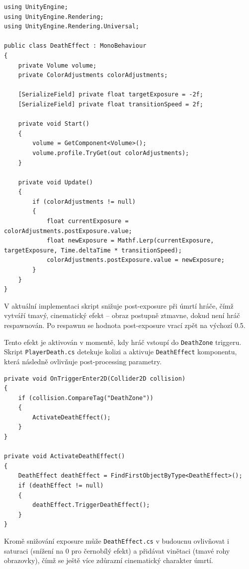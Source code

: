 \newpage

\begin{lstlisting}[caption={DeathEffect.cs -- základní struktura}, label={lst:deatheffect}]
using UnityEngine;
using UnityEngine.Rendering;
using UnityEngine.Rendering.Universal;

public class DeathEffect : MonoBehaviour
{
    private Volume volume;
    private ColorAdjustments colorAdjustments;
    
    [SerializeField] private float targetExposure = -2f;
    [SerializeField] private float transitionSpeed = 2f;
    
    private void Start()
    {
        volume = GetComponent<Volume>();
        volume.profile.TryGet(out colorAdjustments);
    }
    
    private void Update()
    {
        if (colorAdjustments != null)
        {
            float currentExposure = colorAdjustments.postExposure.value;
            float newExposure = Mathf.Lerp(currentExposure, targetExposure, Time.deltaTime * transitionSpeed);
            colorAdjustments.postExposure.value = newExposure;
        }
    }
}
\end{lstlisting}

V aktuální implementaci skript snižuje post-exposure při úmrtí hráče, čímž vytváří tmavý, cinematický efekt -- obraz postupně ztmavne, dokud není hráč respawnován. Po respawnu se hodnota post-exposure vrací zpět na výchozí 0.5.

Tento efekt je aktivován v momentě, kdy hráč vstoupí do \texttt{DeathZone} triggeru. Skript \texttt{PlayerDeath.cs} detekuje kolizi a aktivuje \texttt{DeathEffect} komponentu, která následně ovlivňuje post-processing parametry.

\newpage

\begin{lstlisting}[caption={PlayerDeath.cs -- aktivace Death Effectu}, label={lst:playerdeath-deatheffect}]
private void OnTriggerEnter2D(Collider2D collision)
{
    if (collision.CompareTag("DeathZone"))
    {
        ActivateDeathEffect();
    }
}

private void ActivateDeathEffect()
{
    DeathEffect deathEffect = FindFirstObjectByType<DeathEffect>();
    if (deathEffect != null)
    {
        deathEffect.TriggerDeathEffect();
    }
}
\end{lstlisting}

Kromě snižování exposure může \texttt{DeathEffect.cs} v budoucnu ovlivňovat i saturaci (snížení na 0 pro černobílý efekt) a přidávat vinětaci (tmavé rohy obrazovky), čímž se ještě více zdůrazní cinematický charakter úmrtí.

